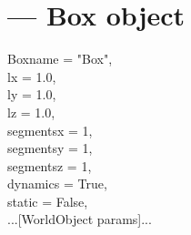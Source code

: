 
\section{ ---
         Box object}

\begin{classdesc}{Box}{name = "Box",\\ 
                       lx = 1.0,\\
                       ly = 1.0,\\
                       lz = 1.0,\\
                       segmentsx = 1,\\
                       segmentsy = 1,\\
                       segmentsz = 1,\\
                       dynamics = True,\\
                       static = False,\\
                       ...[WorldObject params]...
                       }

\end{classdesc}



